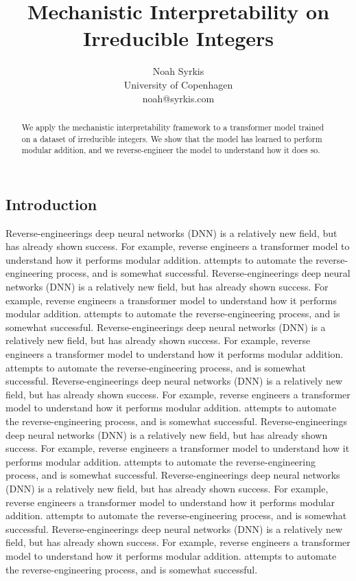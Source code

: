 \documentclass[11pt]{article} %
\title{Mechanistic Interpretability on Irreducible Integers}
\author{Noah Syrkis \\ University of Copenhagen \\ noah@syrkis.com}
\date{}
\begin{document}
\maketitle %
\begin{multicols}{2}
  \begin{abstract}
  We apply the mechanistic interpretability framework to a transformer model trained on a dataset of irreducible integers. We show that the model has learned to perform modular addition, and we reverse-engineer the model to understand how it does so.
  \end{abstract}

  \section{Introduction}\label{introduction}

  Reverse-engineerings deep neural networks (DNN) is a relatively new
  field, but has already shown success. For example, reverse engineers a
  transformer model to understand how it performs modular addition.
  attempts to automate the reverse-engineering process, and is somewhat
  successful. Reverse-engineerings deep neural networks (DNN) is a
  relatively new field, but has already shown success. For example,
  reverse engineers a transformer model to understand how it performs
  modular addition. attempts to automate the reverse-engineering
  process, and is somewhat successful. Reverse-engineerings deep neural
  networks (DNN) is a relatively new field, but has already shown
  success. For example, reverse engineers a transformer model to
  understand how it performs modular addition. attempts to automate the
  reverse-engineering process, and is somewhat successful.
  Reverse-engineerings deep neural networks (DNN) is a relatively new
  field, but has already shown success. For example, reverse engineers a
  transformer model to understand how it performs modular addition.
  attempts to automate the reverse-engineering process, and is somewhat
  successful. Reverse-engineerings deep neural networks (DNN) is a
  relatively new field, but has already shown success. For example,
  reverse engineers a transformer model to understand how it performs
  modular addition. attempts to automate the reverse-engineering
  process, and is somewhat successful. Reverse-engineerings deep neural
  networks (DNN) is a relatively new field, but has already shown
  success. For example, reverse engineers a transformer model to
  understand how it performs modular addition. attempts to automate the
  reverse-engineering process, and is somewhat successful.
  Reverse-engineerings deep neural networks (DNN) is a relatively new
  field, but has already shown success. For example, reverse engineers a
  transformer model to understand how it performs modular addition.
  attempts to automate the reverse-engineering process, and is somewhat
  successful.


\end{multicols}
\end{document}
